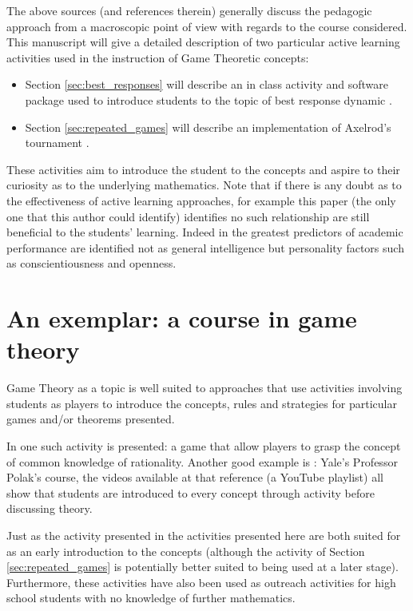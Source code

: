 \documentclass{article}
\begin{document}
The above sources (and references therein) generally discuss the pedagogic
approach from a macroscopic point of view with regards to the course considered.
This manuscript will give a detailed description of two particular active
learning activities used in the instruction of Game Theoretic concepts:

\begin{itemize}
    \item Section \ref{sec:best_responses} will describe an in class activity
        and software package used to introduce students to the topic of best
        response dynamic \cite{Maschler2013}.
    \item Section \ref{sec:repeated_games} will describe an implementation of
        Axelrod's tournament \cite{Axelrod1980a, Axelrod1980b}.
\end{itemize}

These activities aim to introduce the student to the concepts and aspire to
their curiosity as to the underlying mathematics. Note that if there is any
doubt as to the effectiveness of active learning approaches, for example this paper
(the only one that this author could identify) \cite{Andrews2011} identifies no
such relationship are still beneficial to the students' learning.
Indeed in \cite{Poropat2014}  the greatest predictors of
academic performance are identified not as general intelligence \cite{Wright1905} but
personality factors such as conscientiousness and openness.

\section{An exemplar: a course in game theory}\label{sec:game_theory}

Game Theory as a topic is well suited to approaches that use activities
involving students as players to introduce the concepts, rules and strategies
for particular games and/or theorems presented.

In \cite{Brokaw2004} one such activity is presented: a game that allow players
to grasp the concept of common knowledge of rationality. Another good example is
\cite{Polak2008}: Yale's Professor Polak's course, the videos available at that
reference (a YouTube playlist) all show that students are introduced to every
concept through activity before discussing theory.

Just as the activity presented in \cite{Brokaw2004} the activities presented
here are both suited for as an early introduction to the concepts (although the
activity of Section \ref{sec:repeated_games} is potentially better suited to
being used at a later stage). Furthermore, these activities have also been used
as outreach activities for high school students with no knowledge of further
mathematics.
\end{document}
